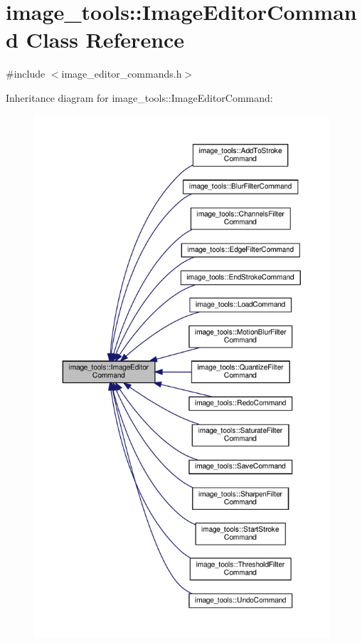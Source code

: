 \hypertarget{classimage__tools_1_1ImageEditorCommand}{}\section{image\+\_\+tools\+:\+:Image\+Editor\+Command Class Reference}
\label{classimage__tools_1_1ImageEditorCommand}


{\ttfamily \#include $<$image\+\_\+editor\+\_\+commands.\+h$>$}



Inheritance diagram for image\+\_\+tools\+:\+:Image\+Editor\+Command\+:
\nopagebreak
\begin{figure}[H]
\begin{center}
\leavevmode
\includegraphics[height=550pt]{classimage__tools_1_1ImageEditorCommand__inherit__graph}
\end{center}
\end{figure}



